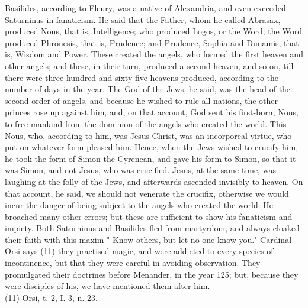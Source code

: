 \documentclass[12pt]{book}
\begin{document}
Basilides, according to Fleury, was a native of Alexandria, and even exceeded Saturninus in fanaticism.
He said that the Father, whom he called Abrasax, produced Nous, that is, Intelligence; who produced
Logos, or the Word; the Word produced Phronesis, that is, Prudence; and Prudence, Sophia and
Dunamis, that is, Wisdom and Power. These created the angels, who formed the first heaven and other
angels; and these, in their turn, produced a second heaven, and so on, till there were three hundred and
sixty-five heavens produced, according to the number of days in the year. The God of the Jews, he said,
was the head of the second order of angels, and because he wished to rule all nations, the other princes
rose up against him, and, on that account, God sent his first-born, Nous, to free mankind from the
dominion of the angels who created the world. This Nous, who, according to him, was Jesus Christ, was
an incorporeal virtue, who put on whatever form pleased him. Hence, when the Jews wished to crucify
him, he took the form of Simon the Cyrenean, and gave his form to Simon, so that it was Simon, and not
Jesus, who was crucified. Jesus, at the same time, was laughing at the folly of the Jews, and afterwards
ascended invisibly to heaven. On that account, he said, we should not venerate the crucifix, otherwise we
would incur the danger of being subject to the angels who created the world. He broached many other
errors; but these are sufficient to show his fanaticism and impiety. Both Saturninus and Basilides fled
from martyrdom, and always cloaked their faith with this maxim " Know others, but let no one know
you." Cardinal Orsi says (11) they practised magic, and were addicted to every species of incontinence,
but that they were careful in avoiding observation. They promulgated their doctrines before Menander,
in the year 125; but, because they were disciples of his, we have mentioned them after him.\\
(11) Orsi, t. 2, I. 3, n. 23.\\
\end{document}
